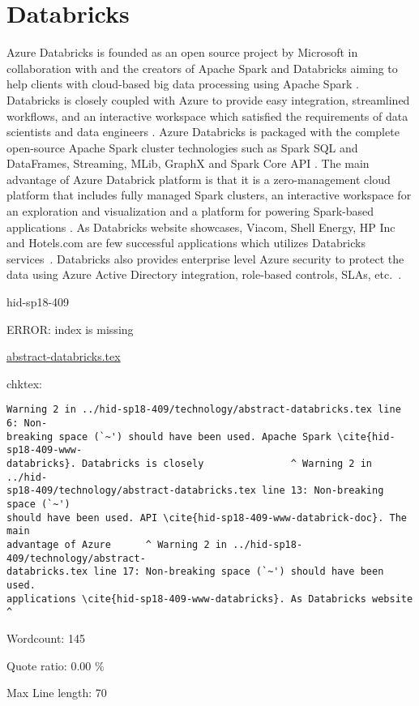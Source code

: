 \section{Databricks}

Azure Databricks is founded as an open source project by Microsoft in
collaboration with and the creators of Apache Spark and Databricks
aiming to help clients with cloud-based big data processing using
Apache Spark \cite{hid-sp18-409-www-databricks}. Databricks is closely
coupled with Azure to provide easy integration, streamlined workflows,
and an interactive workspace which satisfied the requirements of data
scientists and data engineers
\cite{hid-sp18-409-www-databrick-doc}. Azure Databricks is packaged
with the complete open-source Apache Spark cluster technologies such
as Spark SQL and DataFrames, Streaming, MLib, GraphX and Spark Core
API \cite{hid-sp18-409-www-databrick-doc}. The main advantage of Azure
Databrick platform is that it is a zero-management cloud platform that
includes fully managed Spark clusters, an interactive workspace for an
exploration and visualization and a platform for powering Spark-based
applications \cite{hid-sp18-409-www-databricks}. As Databricks website
showcases, Viacom, Shell Energy, HP Inc and Hotels.com are few
successful applications which utilizes Databricks
services~\cite{hid-sp18-409-www-databricks}.  Databricks also provides
enterprise level Azure security to protect the data using Azure Active
Directory integration, role-based controls, SLAs,
etc.~\cite{hid-sp18-409-www-databricks}.


\begin{IU}

hid-sp18-409

ERROR: index is missing

\href{https://github.com/cloudmesh-community/hid-sp18-409/blob/master//technology/abstract-databricks.tex}{abstract-databricks.tex}

 
chktex:
\begin{tiny}
\begin{verbatim}
Warning 2 in ../hid-sp18-409/technology/abstract-databricks.tex line 6: Non-
breaking space (`~') should have been used. Apache Spark \cite{hid-sp18-409-www-
databricks}. Databricks is closely               ^ Warning 2 in ../hid-
sp18-409/technology/abstract-databricks.tex line 13: Non-breaking space (`~')
should have been used. API \cite{hid-sp18-409-www-databrick-doc}. The main
advantage of Azure      ^ Warning 2 in ../hid-sp18-409/technology/abstract-
databricks.tex line 17: Non-breaking space (`~') should have been used.
applications \cite{hid-sp18-409-www-databricks}. As Databricks website
^
\end{verbatim}
\end{tiny}

Wordcount: 145


Quote ratio: 0.00 \%
 
Max Line length: 70
\end{IU}

